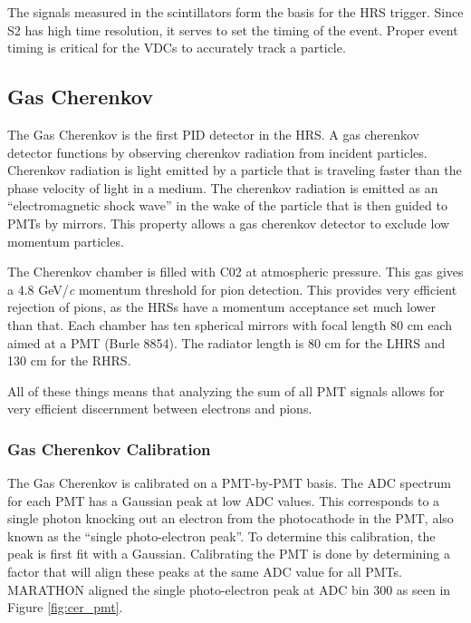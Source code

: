 The signals measured in the scintillators form the basis for the HRS trigger. Since S2 has high time resolution, it serves to set the timing of the event. Proper event timing is critical for the VDCs to accurately track a particle.

\subsection{Gas Cherenkov}
\label{sec:cer}

The Gas Cherenkov is the first PID detector in the HRS. A gas cherenkov detector functions by observing cherenkov radiation from incident particles. Cherenkov radiation is light emitted by a particle that is traveling faster than the phase velocity of light in a medium. The cherenkov radiation is emitted as an ``electromagnetic shock wave'' in the wake of the particle that is then guided to PMTs by mirrors. This property allows a gas cherenkov detector to exclude low momentum particles.\cite{Leo}

The Cherenkov chamber is filled with C02 at atmospheric pressure. This gas gives a 4.8 GeV/\textit{c}  momentum threshold for pion detection. This provides very efficient rejection of pions, as the HRSs have a momentum acceptance set much lower than that. Each chamber has ten spherical mirrors with focal length 80 cm each aimed at a PMT (Burle 8854). The radiator length is 80 cm for the LHRS and 130 cm for the RHRS.

All of these things means that analyzing the sum of all PMT signals allows for very efficient discernment between electrons and pions.

\subsubsection{Gas Cherenkov Calibration}

The Gas Cherenkov is calibrated on a PMT-by-PMT basis. The ADC spectrum for each PMT has a Gaussian peak at low ADC values. This corresponds to a single photon knocking out an electron from the photocathode in the PMT, also known as the ``single photo-electron peak''. To determine this calibration, the peak is first fit with a Gaussian. Calibrating the PMT is done by determining a factor that will align these peaks at the same ADC value for all PMTs. MARATHON aligned the single photo-electron peak at ADC bin 300 as seen in Figure \ref{fig:cer_pmt}.

